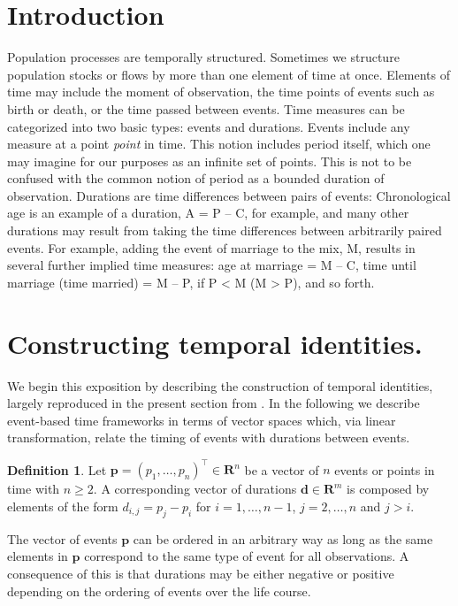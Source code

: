 \documentclass{bmcart}
\theoremstyle{definition}
\newtheorem{definition}{Definition}[section]
\begin{document}
\section{Introduction}
Population processes are temporally structured. Sometimes we structure population stocks or flows by more than one element of time at
once. Elements of time may include the moment of observation, the time points of
events such as birth or death, or the time passed between events. Time measures can be categorized into two basic types:
events and durations. Events include any measure at a point \emph{point}
in time. This notion includes period itself, which one may imagine for our
purposes as an infinite set of points. This is not to be confused with the
common notion of period as a bounded duration of observation. Durations are time
differences between pairs of events:
Chronological age is an example of a duration, A = P -- C, for example, and many
other durations may result from taking the time differences between arbitrarily
paired events. For example, adding the event of marriage to the mix, M, results
in several further implied time measures: age at marriage = M -- C, time until
marriage (time married) = M -- P, if P < M (M > P), and so forth.

\section{Constructing temporal identities.}
\label{sec:framework}

We begin this exposition by describing the construction of temporal
identities, largely reproduced in the present section from
\citet{riffe2017unified}. In the following we describe
event-based time frameworks in terms of vector spaces which, via linear transformation, relate the timing of events with durations between events.

\begin{definition} 
  Let $\boldsymbol{p}=(p_1,\ldots,p_n)^\top\in\mathbf{R}^n$ be a vector of $n$
  events or points in time with $n\geq2$. A corresponding vector of durations $\boldsymbol{d}\in\mathbf{R}^m$ is composed by elements of the form $d_{i,j}=p_j-p_i$ for $i=1,\dots,n-1$, $j=2,\dots,n$ and $j>i$.
  \label{def:1}
\end{definition}

The vector of events $\boldsymbol{p}$ can be ordered in an arbitrary way as long as the same elements in $\boldsymbol{p}$ correspond to the same type of event for all observations. A consequence of this is that durations may be either
negative or positive depending on the ordering of events over the life course.
\end{document}
